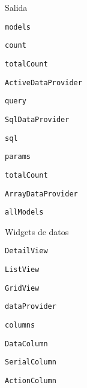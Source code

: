 \begin{longenum}
\begin{longenum}
\begin{longenum}
\begin{longenum}
            \end{longenum}
            \item Salida
            \begin{longenum}
                \item \texttt{models}
                \item \texttt{count}
                \item \texttt{totalCount}
            \end{longenum}
            \item \texttt{ActiveDataProvider}
            \begin{longenum}
                \item \texttt{query}
            \end{longenum}
            \item \texttt{SqlDataProvider}
            \begin{longenum}
                \item \texttt{sql}
                \item \texttt{params}
                \item \texttt{totalCount}
            \end{longenum}
            \item \texttt{ArrayDataProvider}
            \begin{longenum}
                \item \texttt{allModels}
            \end{longenum}
        \end{longenum}
        \item Widgets de datos
        \begin{longenum}
            \item \texttt{DetailView}
            \item \texttt{ListView}
            \item \texttt{GridView}
            \begin{longenum}
                \item \texttt{dataProvider}
                \item \texttt{columns}
                \begin{longenum}
                    \item \texttt{DataColumn}
                    \item \texttt{SerialColumn}
                    \item \texttt{ActionColumn}
                \end{longenum}

\end{longenum}
\end{longenum}
\end{longenum}
\end{longenum}
